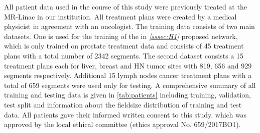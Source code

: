 All patient data used in the course of this study were previously treated at the MR-Linac in our institution. 
All treatment plans were created by a medical physicist in agreement with an oncologist. The training data consists of two main datasets. 
One is used for the training of the in \emph{\ref{sssec:H1} } proposed network, which is only trained on prostate treatment data and consists of 45 treatment plans with a total number of 2342 segments. 
The second dataset consists a 15 treatment plans each for liver, breast and \acs{HN} tumor sites with 819, 656 and 929 segments respectively. 
Additional 15 lymph nodes cancer treatment plans with a total of 659 segments were used only for testing. 
A comprehensive summary of all training and testing data is given in \autoref{tab:patients} including training, validation, test split and information about the fieldsize distribution of training and test data. 
All patients gave their informed written consent to this study, which was approved by the local ethical committee (ethics approval No. 659/2017BO1).


